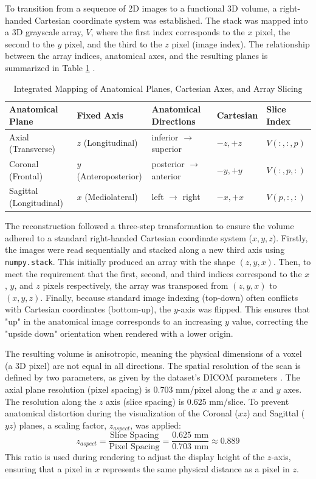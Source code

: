 \documentclass[10pt, twocolumn]{article}
\begin{document}
 To transition from a sequence of 2D images to a functional 3D volume, a right-handed Cartesian coordinate system was established. The stack was mapped into a 3D grayscale array, $V$, where the first index corresponds to the $x$ pixel, the second to the $y$ pixel, and the third to the $z$ pixel (image index). The relationship between the array indices, anatomical axes, and the resulting planes is summarized in Table \ref{tab:integrated_mapping} \cite{AnatomicalTerminologySEER}.

\begin{table}[t]
\centering
\caption{Integrated Mapping of Anatomical Planes, Cartesian Axes, and Array Slicing}
\label{tab:integrated_mapping}
\begin{tabular}{@{}lllll@{}}
\toprule
\textbf{Anatomical Plane} & \textbf{Fixed Axis} & \textbf{Anatomical Directions} & \textbf{Cartesian} & \textbf{Slice Index} \\ \midrule
Axial (Transverse)        & $z$ (Longitudinal)  & inferior $\to$ superior        & $-z, +z$           & $V(:,:,p)$           \\
Coronal (Frontal)         & $y$ (Anteroposterior)& posterior $\to$ anterior       & $-y, +y$           & $V(:,p,:)$           \\
Sagittal (Longitudinal)   & $x$ (Mediolateral)  & left $\to$ right               & $-x, +x$           & $V(p,:,:)$           \\ \bottomrule
\end{tabular}
\end{table}

The reconstruction followed a three-step transformation to ensure the volume adhered to a standard right-handed Cartesian coordinate system ($x, y, z$). Firstly, the images were read sequentially and stacked along a new third axis using \texttt{numpy.stack}. This initially produced an array with the shape $(z, y, x)$. Then, to meet the requirement that the first, second, and third indices correspond to the $x$, $y$, and $z$ pixels respectively, the array was transposed from $(z, y, x)$ to $(x, y, z)$. Finally, because standard image indexing (top-down) often conflicts with Cartesian coordinates (bottom-up), the $y$-axis was flipped. This ensures that "up" in the anatomical image corresponds to an increasing $y$ value, correcting the "upside down" orientation when rendered with a lower origin.

The resulting volume is anisotropic, meaning the physical dimensions of a voxel (a 3D pixel) are not equal in all directions. The spatial resolution of the scan is defined by two parameters, as given by the dataset's DICOM parameters \cite{Mulrecon}. The axial plane resolution (pixel spacing) is $0.703$ mm/pixel along the $x$ and $y$ axes. The resolution along the $z$ axis (slice spacing) is $0.625$ mm/slice. To prevent anatomical distortion during the visualization of the Coronal ($xz$) and Sagittal ($yz$) planes, a scaling factor, $z_{aspect}$, was applied: 
$$z_{aspect} = \frac{\text{Slice Spacing}}{\text{Pixel Spacing}} = \frac{0.625\text{ mm}}{0.703\text{ mm}} \approx 0.889$$
This ratio is used during rendering to adjust the display height of the $z$-axis, ensuring that a pixel in $x$ represents the same physical distance as a pixel in $z$.
\end{document}
